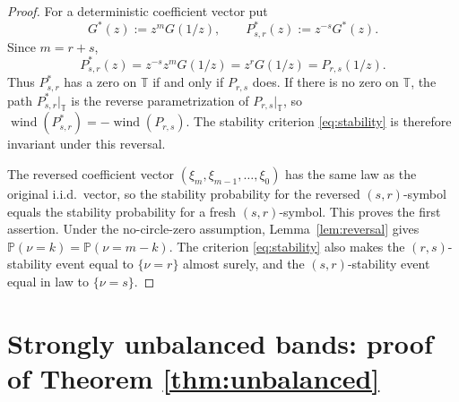 \documentclass[11pt]{article}
\newcommand{\T}{\mathbb{T}}
\newcommand{\PP}{\mathbb{P}}
\newcommand{\wind}{\operatorname{wind}}
\begin{document}
\begin{proof}
For a deterministic coefficient vector put
\[
G^*(z):=z^mG(1/z),\qquad P^*_{s,r}(z):=z^{-s}G^*(z).
\]
Since \(m=r+s\),
\[
P^*_{s,r}(z)=z^{-s}z^mG(1/z)=z^rG(1/z)=P_{r,s}(1/z).
\]
Thus \(P^*_{s,r}\) has a zero on \(\T\) if and only if \(P_{r,s}\) does.  If
there is no zero on \(\T\), the path \(P^*_{s,r}|_{\T}\) is the reverse
parametrization of \(P_{r,s}|_{\T}\), so
\(\wind(P^*_{s,r})=-\wind(P_{r,s})\).  The stability criterion
\eqref{eq:stability} is therefore invariant under this reversal.

The reversed coefficient vector \((\xi_m,\xi_{m-1},\dots,\xi_0)\) has the same
law as the original i.i.d.\ vector, so the stability probability for the
reversed \((s,r)\)-symbol equals the stability probability for a fresh
\((s,r)\)-symbol.  This proves the first assertion.  Under the no-circle-zero
assumption, Lemma~\ref{lem:reversal} gives
\(\PP(\nu=k)=\PP(\nu=m-k)\).  The criterion \eqref{eq:stability} also makes the
\((r,s)\)-stability event equal to \(\{\nu=r\}\) almost surely, and the
\((s,r)\)-stability event equal in law to \(\{\nu=s\}\).
\end{proof}

\section{Strongly unbalanced bands: proof of Theorem \ref{thm:unbalanced}}
\label{sec:unbalanced}
\end{document}
